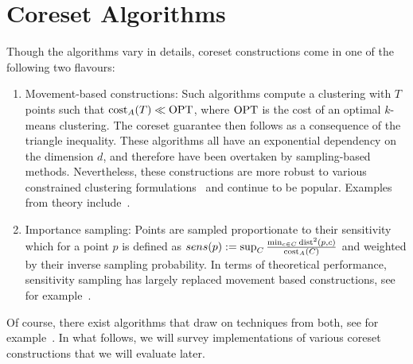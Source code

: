 \section{Coreset Algorithms}

Though the algorithms vary in details, coreset constructions come in one of the following two flavours:
\begin{enumerate}
\item Movement-based constructions: Such algorithms compute a clustering with $T$ points such that $\text{cost}_A(T)\ll \text{OPT}$, where $\text{OPT}$ is the cost of an optimal $k$-means clustering. The coreset guarantee then follows as a consequence of the triangle inequality. These algorithms all have an exponential dependency on the dimension $d$, and therefore have been overtaken by sampling-based methods. Nevertheless, these constructions are more robust to various constrained clustering formulations~\cite{HuangJV19,SSS19} and continue to be popular. Examples from theory include~\cite{FrahlS2005,HaM04}. 
\item Importance sampling: Points are sampled proportionate to their sensitivity which for a point $p$ is defined as $sens(p):=\sup_{C} \frac{\min_{c\in C} \text{dist}^2(p,c)}{\text{cost}_A(C)}$ and weighted by their inverse sampling probability. In terms of theoretical performance, sensitivity sampling has largely replaced movement based constructions, see for example~\cite{FeldmanL11,LangbergS10}.  
\end{enumerate}

Of course, there exist algorithms that draw on techniques from both, see for example~\cite{Cohen-AddadSS21}. In what follows, we will survey implementations of various coreset constructions that we will evaluate later.



